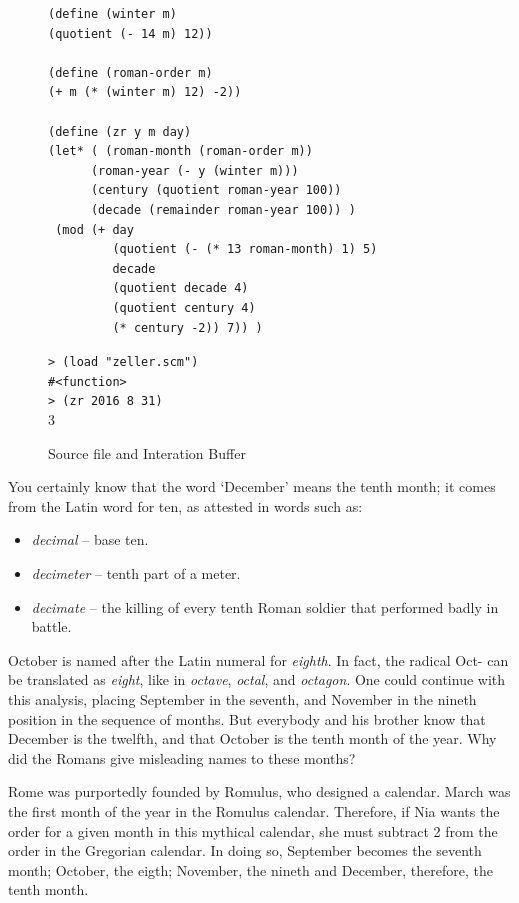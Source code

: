 \documentclass[a4paper,12pt]{book}
\newenvironment{fmpage}[1]
           {\begin{lrbox}{\fmbox}\begin{minipage}{#1}}
           {\end{minipage}\end{lrbox}\fbox{\usebox{\fmbox}}}
\begin{document}
\begin{figure}[!b]
\begin{fmpage}{0.9\linewidth}
\begin{verbatim}
(define (winter m)
(quotient (- 14 m) 12))

(define (roman-order m)
(+ m (* (winter m) 12) -2))

(define (zr y m day)
(let* ( (roman-month (roman-order m))
      (roman-year (- y (winter m)))
      (century (quotient roman-year 100))
      (decade (remainder roman-year 100)) )
 (mod (+ day
         (quotient (- (* 13 roman-month) 1) 5)
         decade
         (quotient decade 4)
         (quotient century 4)
         (* century -2)) 7)) )
\end{verbatim}
\end{fmpage}

\begin{fmpage}{0.9\linewidth}
\verb|> (load "zeller.scm")|\\
\verb|#<function>|\\
\verb|> (zr 2016 8 31)|\\
3
\end{fmpage}
\caption{Source file and Interation Buffer}
\label{fig:date-calculation}
\end{figure}

You certainly know that the word `December' means
the tenth month; it comes from the Latin word for
ten, as attested in words such as:
\begin{itemize}
\item {\em decimal} -- base ten.
\item {\em decimeter} -- tenth part of a meter.
\item {\em decimate} -- the killing of every tenth
Roman soldier that performed badly in battle.
\end{itemize}

October is named after the Latin numeral for {\em eighth}.
In fact, the radical {\sc Oct-} can be translated
as {\em eight}, like in
{\em octave}, {\em octal}, and {\em octagon}.
One could continue with this analysis,
placing September in the seventh,
and November in the nineth position
in the sequence of months.
But everybody and
his brother know that December is the
twelfth, and that
October is the tenth month of the
year. Why did the Romans give misleading
names to these months?

Rome was purportedly founded by Romulus,
who designed a calendar.
March was the first month of the year
in the Romulus calendar. Therefore, if Nia
wants the order for a given month in
this mythical calendar, she must
subtract 2 from the order
in the Gregorian calendar.
In doing so, September becomes the
seventh month; October, the eigth;
November, the nineth and
December, therefore, the tenth month.
\end{document}
